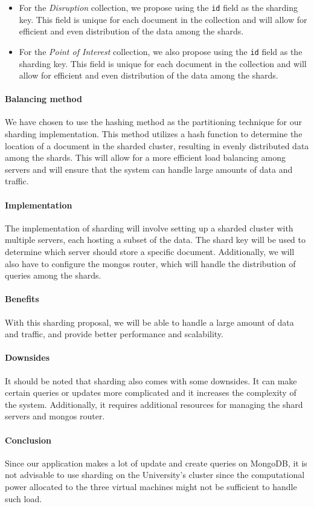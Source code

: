\begin{itemize}
	\item For the \textit{Disruption} collection, we propose using the \texttt{id} field as the sharding key. This field is unique for each document in the collection and will allow for efficient and even distribution of the data among the shards.
	
	\item For the \textit{Point of Interest} collection, we also propose using the \texttt{id} field as the sharding key. This field is unique for each document in the collection and will allow for efficient and even distribution of the data among the shards.
	
\end{itemize}

\paragraph{Balancing method}
We have chosen to use the hashing method as the partitioning technique for our sharding implementation. This method utilizes a hash function to determine the location of a document in the sharded cluster, resulting in evenly distributed data among the shards. This will allow for a more efficient load balancing among servers and will ensure that the system can handle large amounts of data and traffic.

\paragraph{Implementation}
The implementation of sharding will involve setting up a sharded cluster with multiple servers, each hosting a subset of the data. The shard key will be used to determine which server should store a specific document. Additionally, we will also have to configure the mongos router, which will handle the distribution of queries among the shards.

\paragraph{Benefits}
With this sharding proposal, we will be able to handle a large amount of data and traffic, and provide better performance and scalability.

\paragraph{Downsides}
It should be noted that sharding also comes with some downsides. It can make certain queries or updates more complicated and it increases the complexity of the system. Additionally, it requires additional resources for managing the shard servers and mongos router.

\paragraph{Conclusion}
Since our application makes a lot of update and create queries on MongoDB, it is not advisable to use sharding on the University's cluster since the computational power allocated to the three virtual machines might not be sufficient to handle such load.